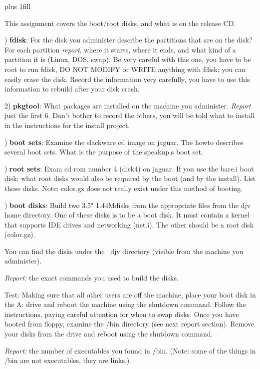 
\rightskip=0pt plus 1fill

\parindent 0pt

This assignment covers the boot/root disks, and what is on the release CD.

) {\bf fdisk}:
For the disk you administer describe the partitions that are on the disk?
For each partition {\it report}, where it starts, where it ends, and what kind
of a partition it is (Linux, DOS, swap).
Be very careful with this one, you have to be root to run fdisk,
DO NOT MODIFY or WRITE anything with fdisk; 
you can easily erase the disk.
Record the information very carefully, you have to use this information
to rebuild after your disk crash.

2) {\bf pkgtool}:
What packages are installed on the machine you administer.
{\it Report} just the first 6. Don't bother to record the others, you will
be told what to install in the instructions for the install project.

) {\bf boot sets}:
Examine the slackware cd image on {\ltt{}jaguar}.
The howto describes several boot sets.
What is the purpose of the {\ltt{}speakup.s} boot set.

) {\bf root sets}:
Exam cd rom number 4 (disk4) on {\ltt{}jaguar}.
If you use the {\ltt{}bare.i} boot disk;
what root disks would also be required by the boot (and
by the install).
List those disks. Note: {\ltt{}color.gz} does not really
exist under this method of booting.

) {\bf boot disks}:
Build two 3.5" 1.44Mdisks from the appropriate files from the {\ltt{}djv} home directory.
One of these disks is to be a boot disk.
It must contain a kernel that supports IDE drives
and networking ({\ltt{}net.i}).
The other should be a root disk ({\ltt{}color.gz}).

You can find the disks under the {\ltt{}~djv}
directory (visible from the machine you administer).

{\it Report:} the exact commands you used to build the disks.

Test: Making sure that all other users are off the machine,
place your boot disk in the A: drive and
reboot the machine using the shutdown command.
Follow the instructions, paying careful attention for when to swap disks.
Once you have booted from floppy, examine the {\ltt{}/bin} directory
(see next report section).
Remove your disks from the drive and reboot using the shutdown command.

{\it Report:} the number of executables you found in {\ltt{}/bin}.
(Note: some of the things in {\ltt{}/bin} are not executables, they are links.)

\bye
